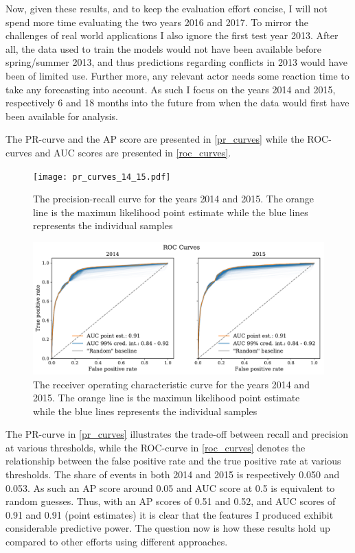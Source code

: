 \documentclass[a4paper]{article}
\begin{document}
Now, given these results, and to keep the evaluation effort concise, I will not spend more time evaluating the two years 2016 and 2017. To mirror the challenges of real world applications I also ignore the first test year 2013. After all, the data used to train the models would not have been available before spring/summer 2013, and thus predictions regarding conflicts in 2013 would have been of limited use. Further more, any relevant actor needs some reaction time to take any forecasting into account. As such I focus on the years 2014 and 2015, respectively 6 and 18 months into the future from when the data would first have been available for analysis.\par

The PR-curve and the AP score are presented in \autoref{pr_curves} while the ROC-curves and AUC scores are presented in \autoref{roc_curves}.\par 

\begin{figure}[!htb]
	\centering
	\texttt{[image: pr\_curves\_14\_15.pdf]}%
    \caption{\footnotesize{The precision-recall curve for the years 2014 and 2015. The orange line is the maximun likelihood point estimate while the blue lines represents the individual samples}}\label{pr_curves}
\end{figure}

\begin{figure}[!htb]
	\centering
	\includegraphics[scale=0.47]{roc_curves_14_15.pdf}
    \caption{\footnotesize{The receiver operating characteristic curve for the years 2014 and 2015. The orange line is the maximun likelihood point estimate while the blue lines represents the individual samples}}\label{roc_curves}
\end{figure}

The PR-curve in \autoref{pr_curves} illustrates the trade-off between recall and precision at various thresholds, while the ROC-curve in \autoref{roc_curves} denotes the relationship between the false positive rate and the true positive rate at various thresholds. The share of events in both 2014 and 2015 is respectively 0.050 and 0.053. As such an AP score around 0.05 and AUC score at 0.5 is equivalent to random guesses. Thus, with an AP scores of 0.51 and 0.52, and AUC scores of 0.91 and 0.91 (point estimates) it is clear that the features I produced exhibit considerable predictive power. The question now is how these results hold up compared to other efforts using different approaches.\par
\end{document}
